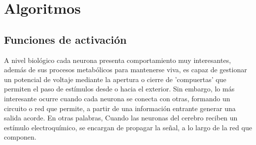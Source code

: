     
    
%        
%        
%        
%        
%        
%    

\section{Algoritmos}
\label{Sec:Algorithm}
    
    \subsection{Funciones de activación}
    \label{sub:FrameActivationFunctions}
    
        A nivel biológico cada neurona presenta comportamiento muy interesantes, además de sus procesos metabólicos para mantenerse viva, es capaz de gestionar un potencial de voltaje mediante la apertura o cierre de 'compuertas' que permiten el paso de estímulos desde o hacia el exterior. Sin embargo, lo más interesante ocurre cuando cada neurona se conecta con otras, formando un circuito o red que permite, a partir de una información entrante generar una salida acorde. En otras palabras, Cuando las neuronas del cerebro reciben un estímulo electroquímico, se encargan de propagar la señal, a lo largo de la red que componen.
        
